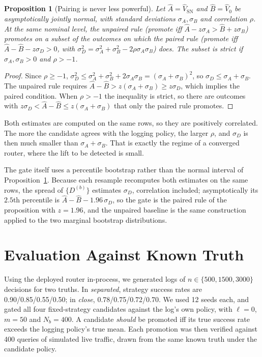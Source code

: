 \documentclass[conference]{IEEEtran}
\newtheorem{proposition}{Proposition}
\begin{document}
\begin{proposition}[Pairing is never less powerful]\label{prop:paired}
Let $\hat A=\hat V_{\mathrm{SN}}$ and $\hat B=\hat V_0$ be asymptotically jointly normal, with standard deviations $\sigma_A,\sigma_B$ and correlation $\rho$. At the same nominal level, the unpaired rule (promote iff $\hat A-z\sigma_A>\hat B+z\sigma_B$) promotes on a subset of the outcomes on which the paired rule (promote iff $\hat A-\hat B-z\sigma_D>0$, with $\sigma_D^2=\sigma_A^2+\sigma_B^2-2\rho\sigma_A\sigma_B$) does. The subset is strict if $\sigma_A,\sigma_B>0$ and $\rho>-1$.
\end{proposition}
\begin{proof}
Since $\rho\ge-1$, $\sigma_D^2\le\sigma_A^2+\sigma_B^2+2\sigma_A\sigma_B=(\sigma_A+\sigma_B)^2$, so $\sigma_D\le\sigma_A+\sigma_B$. The unpaired rule requires $\hat A-\hat B>z(\sigma_A+\sigma_B)\ge z\sigma_D$, which implies the paired condition. When $\rho>-1$ the inequality is strict, so there are outcomes with $z\sigma_D<\hat A-\hat B\le z(\sigma_A+\sigma_B)$ that only the paired rule promotes.
\end{proof}
Both estimates are computed on the same rows, so they are positively correlated. The more the candidate agrees with the logging policy, the larger $\rho$, and $\sigma_D$ is then much smaller than $\sigma_A+\sigma_B$. That is exactly the regime of a converged router, where the lift to be detected is small.

The gate itself uses a percentile bootstrap rather than the normal interval of Proposition~\ref{prop:paired}. Because each resample recomputes both estimates on the same rows, the spread of $\{D^{(b)}\}$ estimates $\sigma_D$, correlation included; asymptotically its $2.5$th percentile is $\hat A-\hat B-1.96\,\sigma_D$, so the gate is the paired rule of the proposition with $z=1.96$, and the unpaired baseline is the same construction applied to the two marginal bootstrap distributions.

\section{Evaluation Against Known Truth}
Using the deployed router in-process, we generated logs of $n\in\{500,1500,3000\}$ decisions for two truths. In \emph{separated}, strategy success rates are 0.90/0.85/0.55/0.50; in \emph{close}, 0.78/0.75/0.72/0.70. We used 12 seeds each, and gated all four fixed-strategy candidates against the log's own policy, with $\ell=0$, $m=50$ and $N_b=400$. A candidate \emph{should} be promoted iff its true success rate exceeds the logging policy's true mean. Each promotion was then verified against 400 queries of simulated live traffic, drawn from the same known truth under the candidate policy.
\end{document}

